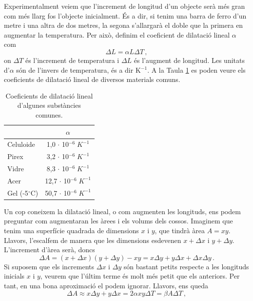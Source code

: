 \documentclass[12pt]{book}
\begin{document}
Experimentalment veiem que l'increment de longitud d'un objecte serà més gran com més llarg fos l'objecte inicialment. És a dir, si tenim una barra de ferro d'un metre i una altra de dos metres, la segona s'allargarà el doble que la primera en augmentar la temperatura. Per això, definim el coeficient de dilatació lineal $\alpha$ com
%
\begin{equation}
    \Delta L = \alpha L \Delta T\, ,
\end{equation}
%
on $\Delta T$ és l'increment de temperatura i $\Delta L$ és l'augment de longitud. Les unitats d'$\alpha$ són de l'invers de temperatura, és a dir K$^{-1}$. A la Taula \ref{tab:DilatacioLineal} es poden veure els coeficients de dilatació lineal de diversos materials comuns.
%
\begin{table}[H]
    \centering
    \begin{tabular}{|l|c|}
    \hline
                  & $\alpha$ \\ \hline
        Celuloide & 1,0 $\cdot$ 10$^{-6} \; K^{-1}$  \\ \hline
        Pirex     & 3,2 $\cdot$ 10$^{-6} \; K^{-1}$  \\ \hline
        Vidre     & 8,3 $\cdot$ 10$^{-6} \; K^{-1}$ \\ \hline
        Acer      & 12,7 $\cdot$ 10$^{-6} \; K^{-1}$  \\ \hline
        Gel (-5$^\circ$C) & 50,7 $\cdot$ 10$^{-6} \; K^{-1}$ \\ \hline
    \end{tabular}
    \caption{Coeficients de dilatació lineal d'algunes substàncies comunes.}
    \label{tab:DilatacioLineal}
\end{table}
%
Un cop coneixem la dilatació lineal, o com augmenten les longituds, ens podem preguntar com augmentaran les àrees i els volums dels cossos. Imaginem que tenim una superfície quadrada de dimensions $x$ i $y$, que tindrà àrea $A = xy$. Llavors, l'escalfem de manera que les dimensions esdevenen $x + \Delta x$ i $y + \Delta y$. L'increment d'àrea serà, doncs
%
\begin{equation}
    \Delta A = (x + \Delta x)(y + \Delta y) - xy = x \Delta y + y \Delta x + \Delta x \Delta y\, .
\end{equation}
%
Si suposem que els increments $\Delta x$ i $\Delta y$ són bastant petits respecte a les longituds inicials $x$ i $y$, veurem que l'últim terme és molt més petit que els anteriors. Per tant, en una bona aproximació el podem ignorar. Llavors, ens queda 
%
\begin{equation}
    \Delta A \approx x \Delta y + y \Delta x = 2 \alpha x y \Delta T = \beta A \Delta T\, ,
\end{equation}
\end{document}
